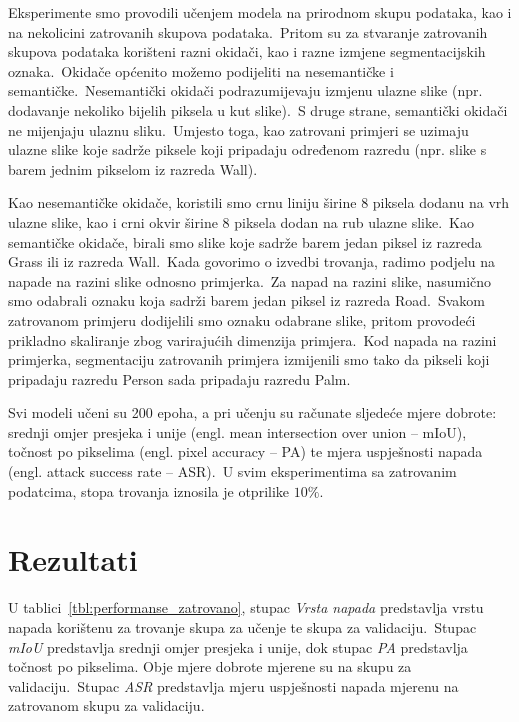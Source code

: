 \documentclass[times, utf8, seminar, numeric]{fer}
\begin{document}
Eksperimente smo provodili učenjem modela na prirodnom skupu podataka, kao i na nekolicini zatrovanih skupova podataka.\ Pritom su za stvaranje zatrovanih skupova podataka korišteni razni okidači, kao i razne izmjene segmentacijskih oznaka.\ 
Okidače općenito možemo podijeliti na nesemantičke i semantičke.\ Nesemantički okidači podrazumijevaju izmjenu ulazne slike (npr. dodavanje nekoliko bijelih piksela u kut slike).\ S druge strane, semantički okidači ne mijenjaju ulaznu sliku.\ 
Umjesto toga, kao zatrovani primjeri se uzimaju ulazne slike koje sadrže piksele koji pripadaju određenom razredu (npr. slike s barem jednim pikselom iz razreda Wall).
  
Kao nesemantičke okidače, koristili smo crnu liniju širine 8 piksela dodanu na vrh ulazne slike, kao  i crni okvir širine 8 piksela dodan na rub ulazne slike.\ Kao semantičke okidače, birali smo slike koje sadrže barem jedan piksel iz razreda Grass ili iz razreda Wall.\ 
Kada govorimo o izvedbi trovanja, radimo podjelu na napade na razini slike odnosno primjerka.\ Za napad na razini slike, nasumično smo odabrali oznaku koja sadrži barem jedan piksel iz razreda Road.\ Svakom zatrovanom primjeru dodijelili smo oznaku odabrane slike, pritom provodeći prikladno skaliranje zbog varirajućih dimenzija primjera.\ 
Kod napada na razini primjerka, segmentaciju zatrovanih primjera izmijenili smo tako da pikseli koji pripadaju razredu Person sada pripadaju razredu Palm.
  
Svi modeli učeni su 200 epoha, a pri učenju su računate sljedeće mjere dobrote: srednji omjer presjeka i unije (engl. mean intersection over union – mIoU), točnost po pikselima (engl. pixel accuracy – PA) te mjera uspješnosti napada (engl. attack success rate – ASR).\ 
U svim eksperimentima sa zatrovanim podatcima, stopa trovanja iznosila je otprilike $10\%$. 

\section{Rezultati}

U tablici~\ref{tbl:performanse_zatrovano}, stupac \textit{Vrsta napada} predstavlja vrstu napada korištenu za trovanje skupa za učenje te skupa za validaciju.\ 
Stupac \textit{mIoU} predstavlja srednji omjer presjeka i unije, dok stupac \textit{PA} predstavlja točnost po pikselima. Obje mjere dobrote mjerene su na skupu za validaciju.\ 
Stupac \textit{ASR} predstavlja mjeru uspješnosti napada mjerenu na zatrovanom skupu za validaciju.
\end{document}
